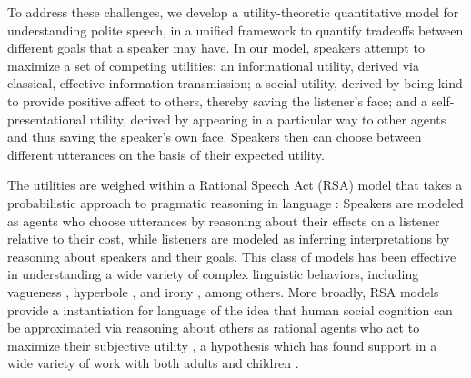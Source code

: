 \documentclass[12pt]{article}
\begin{document}

To address these challenges, we develop a utility-theoretic quantitative
model for understanding polite speech, in a unified framework to
quantify tradeoffs between different goals that a speaker may have. In
our model, speakers attempt to maximize a set of competing utilities: an
informational utility, derived via classical, effective information
transmission; a social utility, derived by being kind to provide
positive affect to others, thereby saving the listener's face; and a
self-presentational utility, derived by appearing in a particular way to
other agents and thus saving the speaker's own face. Speakers then can choose
between different utterances on the basis of their expected utility. 

The utilities are weighed within a Rational Speech Act (RSA) model that takes a
probabilistic approach to pragmatic reasoning in language \cite{frank2012, goodman2016}: 
Speakers are modeled as agents
who choose utterances by reasoning about their effects on a listener
relative to their cost, while listeners are modeled as inferring
interpretations by reasoning about speakers and their goals. This class
of models has been effective in understanding a wide variety of complex
linguistic behaviors, including vagueness \cite{lassiter2017adjectival},
hyperbole \cite{kao2014}, and irony \cite{kao2015}, among others. 
More broadly, RSA models provide a
instantiation for language of the idea that human social cognition can
be approximated via reasoning about others as rational agents who act to
maximize their subjective utility \cite{baker2009action}, a
hypothesis which has found support in a wide variety of work with both
adults and children \cite{jara2016naive, liu2017ten}.

\end{document}
